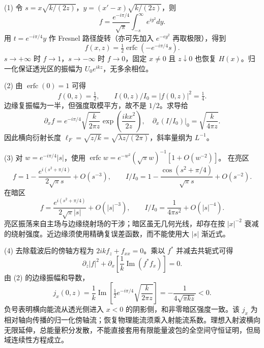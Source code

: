 (1) 令 \(s=x\sqrt{k/(2z)}\)，\(y=(x'-x)\sqrt{k/(2z)}\)，则
\[
f=\frac{e^{-i\pi/4}}{\sqrt\pi}\int_{-s}^\infty e^{iy^2}dy.
\]
用 \(t=e^{-i\pi/4}y\) 作 Fresnel 路径旋转（亦可先加入 \(e^{-\epsilon y^2}\) 再取极限），得到
\[
\boxed{f(x,z)=\tfrac12\operatorname{erfc}(-e^{-i\pi/4}s)}.
\]
\(s\to+\infty\) 时 \(f\to1\)，\(s\to-\infty\) 时 \(f\to0\)，固定 \(x\ne0\) 且 \(z\downarrow0\) 也恢复 \(H(x)\)。归一化保证透光区的振幅为 \(U_0e^{ikz}\)，无多余相位。

(2) 由 \(\operatorname{erfc}(0)=1\) 可得
\[
\boxed{f(0,z)=\tfrac12,\qquad I(0,z)/I_0=|f(0,z)|^2=\tfrac14}.
\]
边缘复振幅为一半，但强度取模平方，故不是 \(1/2\)。求导给
\[
\partial_xf=e^{-i\pi/4}\sqrt{\frac{k}{2\pi z}}
\exp\!\left(\frac{ikx^2}{2z}\right),\quad
\boxed{\left.\partial_x(I/I_0)\right|_{0}=\sqrt{\frac{k}{4\pi z}}}.
\]
因此横向衍射长度 \(\ell_F=\sqrt{z/k}=\sqrt{\lambda z/(2\pi)}\)，斜率量纲为 \(L^{-1}\)。

(3) 对 \(w=e^{-i\pi/4}|s|\)，使用
\(\operatorname{erfc}w=e^{-w^2}(\sqrt\pi w)^{-1}[1+O(w^{-2})]\)。
在亮区
\[
f=1-\frac{e^{i(s^2+\pi/4)}}{2\sqrt\pi s}+O(s^{-3}),\qquad
\boxed{I/I_0=1-\frac{\cos(s^2+\pi/4)}{\sqrt\pi s}+O(s^{-2})}.
\]
在暗区
\[
f=\frac{e^{i(s^2+\pi/4)}}{2\sqrt\pi|s|}+O(|s|^{-3}),\qquad
\boxed{I/I_0=\frac{1}{4\pi s^2}+O(|s|^{-4})}.
\]
亮区振荡来自主场与边缘绕射场的干涉；暗区虽无几何光线，却存在按 \(|x|^{-2}\) 衰减的绕射强度。近边缘须使用精确复误差函数，而不能使用大 \(|s|\) 渐近式。

(4) 去除载波后的傍轴方程为 \(2ikf_z+f_{xx}=0\)。乘以 \(f^*\) 并减去共轭式可得
\[
\boxed{\partial_z|f|^2+\partial_x\!\left[\frac1k\operatorname{Im}(f^*f_x)\right]=0}.
\]
由 (2) 的边缘振幅和导数，
\[
\boxed{j_x(0,z)=\frac1k\operatorname{Im}\!\left[\tfrac12e^{-i\pi/4}\sqrt{\frac{k}{2\pi z}}\right]
=-\frac{1}{4\sqrt{\pi kz}}<0}.
\]
负号表明横向能流从透光侧进入 \(x<0\) 的阴影侧，和非零暗区强度一致。该 \(j_x\) 为相对轴向传播的归一化傍轴流；恢复物理能流须乘入射能流系数。理想入射波横向无限延伸，总能量积分发散，不能直接套用有限能量波包的全空间守恒证明，但局域连续性方程成立。
